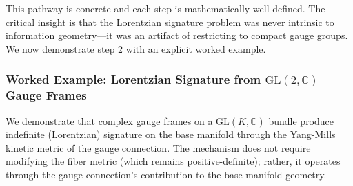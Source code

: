 \documentclass[11pt]{article}
\begin{document}
This pathway is concrete and each step is mathematically well-defined. The critical insight is that the Lorentzian signature problem was never intrinsic to information geometry---it was an artifact of restricting to compact gauge groups. We now demonstrate step 2 with an explicit worked example.

\subsubsection{Worked Example: Lorentzian Signature from $\mathrm{GL}(2, \mathbb{C})$ Gauge Frames}
\label{sec:worked_signature}

We demonstrate that complex gauge frames on a $\mathrm{GL}(K, \mathbb{C})$ bundle produce indefinite (Lorentzian) signature on the base manifold through the Yang-Mills kinetic metric of the gauge connection. The mechanism does not require modifying the fiber metric (which remains positive-definite); rather, it operates through the gauge connection's contribution to the base manifold geometry.
\end{document}
